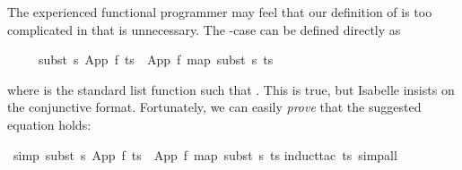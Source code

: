 \begin{isabellebody}
\begin{isamarkuptext}
The experienced functional programmer may feel that our definition of
 is too complicated in that  is
unnecessary. The -case can be defined directly as
\begin{isabelle}%
\ \ \ \ \ subst\ s\ {}App\ f\ ts{}\ {}\ App\ f\ {}map\ {}subst\ s{}\ ts{}%
\end{isabelle}
where  is the standard list function such that
. This is true, but Isabelle
insists on the conjunctive format. Fortunately, we can easily \emph{prove}
that the suggested equation holds:%
\end{isamarkuptext}%
\isamarkuptrue%
%
\isadelimproof
%
\endisadelimproof
%
\isatagproof
%
\endisatagproof
{\isafoldproof}%
%
\isadelimproof
%
\endisadelimproof
%
\isadelimproof
%
\endisadelimproof
%
\isatagproof
%
\endisatagproof
{\isafoldproof}%
%
\isadelimproof
%
\endisadelimproof
%
\isadelimproof
%
\endisadelimproof
%
\isatagproof
%
\endisatagproof
{\isafoldproof}%
%
\isadelimproof
\isanewline
%
\endisadelimproof
{}\isamarkupfalse%
\ {}simp{}{}\ {}subst\ s\ {}App\ f\ ts{}\ {}\ App\ f\ {}map\ {}subst\ s{}\ ts{}{}\isanewline
%
\isadelimproof
%
\endisadelimproof
%
\isatagproof
{}\isamarkupfalse%
{}induct{}tac\ ts{}\ simp{}all{}\isanewline

\end{isabellebody}
